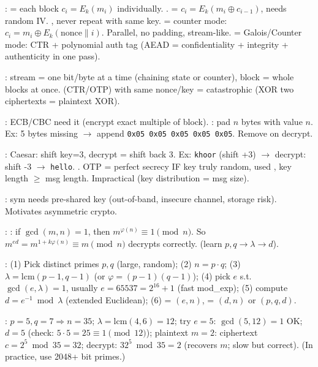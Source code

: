 :  = each block $c_i = E_k(m_i)$ individually. .  = $c_i = E_k(m_i \oplus c_{i-1})$, needs random IV. , never repeat with same key.  = counter mode: $c_i = m_i \oplus E_k(\text{nonce} \| i)$. Parallel, no padding, stream-like.  = Galois/Counter mode: CTR + polynomial auth tag (AEAD = confidentiality + integrity + authenticity in one pass).

: stream = one bit/byte at a time (chaining state or counter), block = whole blocks at once.  (CTR/OTP) with same nonce/key = catastrophic (XOR two ciphertexts = plaintext XOR).

: ECB/CBC need it (encrypt exact multiple of block). : pad $n$ bytes with value $n$. Ex: 5 bytes missing $\to$ append \texttt{0x05 0x05 0x05 0x05 0x05}. Remove on decrypt.

: Caesar: shift key=3, decrypt = shift back 3. Ex: \texttt{khoor} (shift +3) $\to$ decrypt: shift -3 $\to$ \texttt{hello}. . OTP = perfect secrecy IF key truly random, used , key length $\geq$ msg length. Impractical (key distribution = msg size).

: sym needs pre-shared key (out-of-band, insecure channel, storage risk). Motivates asymmetric crypto.


: : if $\gcd(m,n)=1$, then $m^{\varphi(n)} \equiv 1 \pmod{n}$. So $m^{ed} = m^{1+k\varphi(n)} \equiv m \pmod{n}$ decrypts correctly.  (learn $p,q \to \lambda \to d$).

: (1) Pick distinct primes $p,q$ (large, random); (2) $n = p \cdot q$; (3) $\lambda = \mathrm{lcm}(p{-}1, q{-}1)$ (or $\varphi = (p{-}1)(q{-}1)$); (4) pick $e$ s.t. $\gcd(e, \lambda) = 1$, usually $e = 65537 = 2^{16}+1$ (fast mod\_exp); (5) compute $d = e^{-1} \bmod \lambda$ (extended Euclidean); (6)  = $(e,n)$,  = $(d,n)$ or $(p,q,d)$.

: $p=5, q=7 \Rightarrow n=35$; $\lambda=\mathrm{lcm}(4,6)=12$; try $e=5$: $\gcd(5,12)=1$ OK; $d=5$ (check: $5 \cdot 5 = 25 \equiv 1 \pmod{12}$); plaintext $m=2$: ciphertext $c = 2^5 \bmod 35 = 32$; decrypt: $32^5 \bmod 35 = 2$ (recovers $m$; slow but correct). (In practice, use 2048+ bit primes.)

